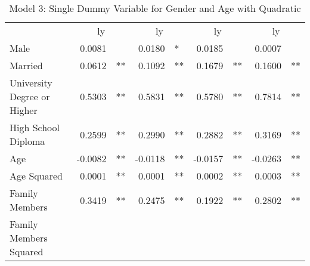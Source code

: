 \documentclass[12pt]{article}
\begin{document}
\begin{table}[!h]
\caption{Model 3: Single Dummy Variable for Gender and Age with Quadratic}
\centering
\begin{tabular}{lllllllll}
\cline{1-9}
\multicolumn{1}{r}{} &
  \multicolumn{2}{c}{ly} &
  \multicolumn{2}{c}{ly} &
  \multicolumn{2}{c}{ly} &
  \multicolumn{2}{c}{ly} \\
\cline{1-9}
\multicolumn{1}{l}{Male} &
  \multicolumn{1}{r}{0.0081} &
  \multicolumn{1}{l}{} &
  \multicolumn{1}{r}{0.0180} &
  \multicolumn{1}{l}{*} &
  \multicolumn{1}{r}{0.0185} &
  \multicolumn{1}{l}{} &
  \multicolumn{1}{r}{0.0007} &
  \multicolumn{1}{l}{} \\
\multicolumn{1}{l}{Married} &
  \multicolumn{1}{r}{0.0612} &
  \multicolumn{1}{l}{**} &
  \multicolumn{1}{r}{0.1092} &
  \multicolumn{1}{l}{**} &
  \multicolumn{1}{r}{0.1679} &
  \multicolumn{1}{l}{**} &
  \multicolumn{1}{r}{0.1600} &
  \multicolumn{1}{l}{**} \\
\multicolumn{1}{l}{University Degree or Higher} &
  \multicolumn{1}{r}{0.5303} &
  \multicolumn{1}{l}{**} &
  \multicolumn{1}{r}{0.5831} &
  \multicolumn{1}{l}{**} &
  \multicolumn{1}{r}{0.5780} &
  \multicolumn{1}{l}{**} &
  \multicolumn{1}{r}{0.7814} &
  \multicolumn{1}{l}{**} \\
\multicolumn{1}{l}{High School Diploma} &
  \multicolumn{1}{r}{0.2599} &
  \multicolumn{1}{l}{**} &
  \multicolumn{1}{r}{0.2990} &
  \multicolumn{1}{l}{**} &
  \multicolumn{1}{r}{0.2882} &
  \multicolumn{1}{l}{**} &
  \multicolumn{1}{r}{0.3169} &
  \multicolumn{1}{l}{**} \\
\multicolumn{1}{l}{Age} &
  \multicolumn{1}{r}{-0.0082} &
  \multicolumn{1}{l}{**} &
  \multicolumn{1}{r}{-0.0118} &
  \multicolumn{1}{l}{**} &
  \multicolumn{1}{r}{-0.0157} &
  \multicolumn{1}{l}{**} &
  \multicolumn{1}{r}{-0.0263} &
  \multicolumn{1}{l}{**} \\
\multicolumn{1}{l}{Age Squared} &
  \multicolumn{1}{r}{0.0001} &
  \multicolumn{1}{l}{**} &
  \multicolumn{1}{r}{0.0001} &
  \multicolumn{1}{l}{**} &
  \multicolumn{1}{r}{0.0002} &
  \multicolumn{1}{l}{**} &
  \multicolumn{1}{r}{0.0003} &
  \multicolumn{1}{l}{**} \\
\multicolumn{1}{l}{Family Members} &
  \multicolumn{1}{r}{0.3419} &
  \multicolumn{1}{l}{**} &
  \multicolumn{1}{r}{0.2475} &
  \multicolumn{1}{l}{**} &
  \multicolumn{1}{r}{0.1922} &
  \multicolumn{1}{l}{**} &
  \multicolumn{1}{r}{0.2802} &
  \multicolumn{1}{l}{**} \\
\multicolumn{1}{l}{Family Members Squared} &

\end{tabular}
\end{table}
\end{document}
